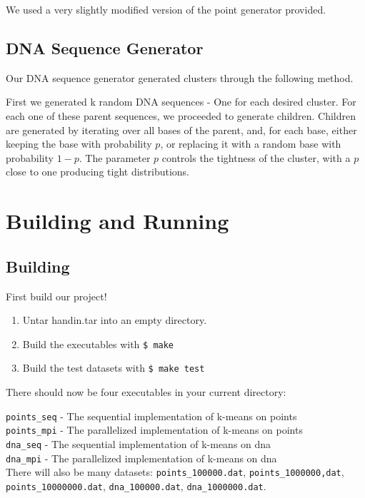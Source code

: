 \documentclass[12pt]{article}
\begin{document}
We used a very slightly modified version of the point generator provided.

\subsection{DNA Sequence Generator}

Our DNA sequence generator generated clusters through the following method.

First we generated k random DNA sequences - One for each desired cluster. For each one of these parent sequences, we proceeded to generate children. Children are generated by iterating over all bases of the parent, and, for each base, either keeping the base with probability $p$, or replacing it with a random base with probability $1-p$. The parameter $p$ controls the tightness of the cluster, with a $p$ close to one producing tight distributions.

\section{Building and Running}
 
\subsection{Building}

First build our project!

\begin{enumerate}
\item Untar handin.tar into an empty directory.
\item Build the executables with \texttt{\$ make}
\item Build the test datasets with \texttt{\$ make test}
\end{enumerate}

There should now be four executables in your current directory: 


\texttt{points\_seq} - The sequential implementation of k-means on points \\
\texttt{points\_mpi} - The parallelized implementation of k-means on points \\
\texttt{dna\_seq} - The sequential implementation of k-means on dna \\
\texttt{dna\_mpi} - The parallelized implementation of k-means on dna \\

There will also be many datasets: \texttt{points\_100000.dat},
\texttt{points\_1000000,dat}, \texttt{points\_10000000.dat},
\texttt{dna\_100000.dat}, \texttt{dna\_1000000.dat}.
\end{document}
